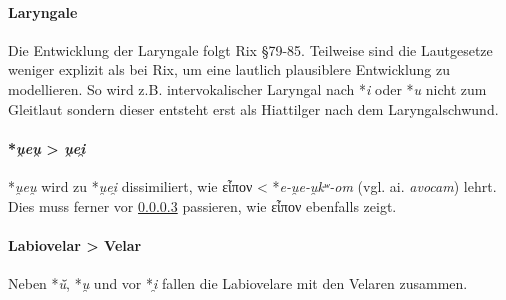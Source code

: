 \documentclass[12pt,a4paper,normalheadings]{scrartcl}
\def\rek#1{*\textit{#1}}
\def\bel#1{\textit{#1}}
\begin{document}
\paragraph{Laryngale}
Die Entwicklung der Laryngale folgt Rix §79-85.
Teilweise sind die Lautgesetze weniger explizit als bei Rix,
um eine lautlich plausiblere Entwicklung zu modellieren.
So wird z.B. intervokalischer Laryngal nach \rek{i} oder \rek{u}
nicht zum Gleitlaut sondern dieser entsteht erst als Hiattilger
nach dem Laryngalschwund.

\paragraph{\rek{u̯eu̯} > \bel{u̯ei̯}}
\rek{u̯eu̯} wird zu \rek{u̯ei̯} dissimiliert,
wie εἶπον < \rek{e-u̯e-u̯kʷ-om} (vgl. ai. \bel{avocam}) lehrt.
Dies muss ferner vor \ref{labvel-vel} passieren,
wie εἶπον ebenfalls zeigt.

\paragraph{Labiovelar > Velar}
\label{labvel-vel}
Neben \rek{ū̆}, \rek{u̯} und vor \rek{i̯}
fallen die Labiovelare mit den Velaren zusammen.

\printbibliography
\end{document}
